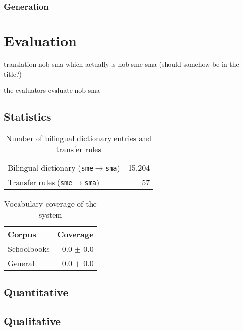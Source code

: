 \documentclass[a4paper,11pt,twocolumn]{article}
\begin{document}
\subsubsection{Generation}

\section{Evaluation}
\item translation nob-sma which actually is nob-sme-sma (should somehow be in the title?) 
\item the evaluators evaluate nob-sma

\subsection{Statistics}
\begin{table}
  \begin{center}
    \begin{tabular}{|l|r|}
      \hline
      Bilingual dictionary ({\tt sme}$\rightarrow${\tt sma}) & 15,204 \\ %
      Transfer rules ({\tt sme}$\rightarrow${\tt sma}) & 57 \\
      \hline
    \end{tabular}
    \label{table:transfer}
    \caption{Number of bilingual dictionary entries and transfer rules}
  \end{center}
\end{table}

\begin{table}
  \begin{center}
    \begin{tabular}{|l|r|}
      \hline
      \textbf{Corpus} & \textbf{Coverage}  \\
      \hline
      Schoolbooks     & 0.0 $\pm$ 0.0 \\
      General         & 0.0 $\pm$ 0.0 \\
      \hline
    \end{tabular}
    \label{table:coverage}
    \caption{Vocabulary coverage of the system}
  \end{center}
\end{table}

\subsection{Quantitative}
\subsection{Qualitative}
\end{document}
